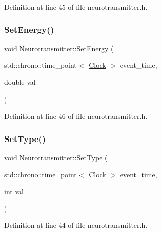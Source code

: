 Definition at line 45 of file neurotransmitter.\+h.

\mbox{\label{class_neurotransmitter_a5ad51ddb1351868e1756e3c41bb88e04}} 
\subsubsection{\texorpdfstring{Set\+Energy()}{SetEnergy()}}
{\footnotesize\ttfamily \mbox{\hyperlink{glad_8h_a950fc91edb4504f62f1c577bf4727c29}{void}} Neurotransmitter\+::\+Set\+Energy (\begin{DoxyParamCaption}\item[{std\+::chrono\+::time\+\_\+point$<$ \mbox{\hyperlink{universe_8h_a0ef8d951d1ca5ab3cfaf7ab4c7a6fd80}{Clock}} $>$}]{event\+\_\+time,  }\item[{double}]{val }\end{DoxyParamCaption})\hspace{0.3cm}{\ttfamily [inline]}}



Definition at line 46 of file neurotransmitter.\+h.

\mbox{\label{class_neurotransmitter_ae460ed5fac92ba136a80bba12ebce246}} 
\subsubsection{\texorpdfstring{Set\+Type()}{SetType()}}
{\footnotesize\ttfamily \mbox{\hyperlink{glad_8h_a950fc91edb4504f62f1c577bf4727c29}{void}} Neurotransmitter\+::\+Set\+Type (\begin{DoxyParamCaption}\item[{std\+::chrono\+::time\+\_\+point$<$ \mbox{\hyperlink{universe_8h_a0ef8d951d1ca5ab3cfaf7ab4c7a6fd80}{Clock}} $>$}]{event\+\_\+time,  }\item[{int}]{val }\end{DoxyParamCaption})\hspace{0.3cm}{\ttfamily [inline]}}



Definition at line 44 of file neurotransmitter.\+h.

\mbox{\label{class_neurotransmitter_ac9f7be22ca7242207de76ec5e1b055b1}} 
